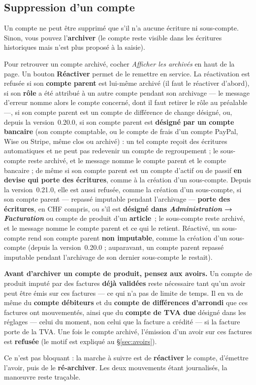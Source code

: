 \documentclass[a4paper,11pt,oneside]{article}
\begin{document}
\subsection{Suppression d'un compte}\label{sec:suppression-compte}

Un compte ne peut être supprimé que s'il n'a aucune écriture ni sous-compte. Sinon, vous pouvez l'\textbf{archiver} (le compte reste visible dans les écritures historiques mais n'est plus proposé à la saisie).

Pour retrouver un compte archivé, cocher \emph{Afficher les archivés} en haut de la page. Un bouton \textbf{Réactiver} permet de le remettre en service. La réactivation est refusée si son \textbf{compte parent} est lui-même archivé (il faut le réactiver d'abord), si son \textbf{rôle} a été attribué à un autre compte pendant son archivage — le message d'erreur nomme alors le compte concerné, dont il faut retirer le rôle au préalable —, si son compte parent est un compte de différence de change désigné, ou, depuis la version~0.20.0, si son compte parent est \textbf{désigné par un compte bancaire} (son compte comptable, ou le compte de frais d'un compte PayPal, Wise ou Stripe, même clos ou archivé) : un tel compte reçoit des écritures automatiques et ne peut pas redevenir un compte de regroupement ; le sous-compte reste archivé, et le message nomme le compte parent et le compte bancaire ; de même si son compte parent est un compte d'actif ou de passif \textbf{en devise qui porte des écritures}, comme à la création d'un sous-compte. Depuis la version~0.21.0, elle est aussi refusée, comme la création d'un sous-compte, si son compte parent --- repassé imputable pendant l'archivage --- \textbf{porte des écritures}, en CHF compris, ou s'il est \textbf{désigné dans \emph{Administration} → \emph{Facturation}} ou compte de produit d'un \textbf{article}~; le sous-compte reste archivé, et le message nomme le compte parent et ce qui le retient. Réactivé, un sous-compte rend son compte parent \textbf{non imputable}, comme la création d'un sous-compte (depuis la version~0.20.0 ; auparavant, un compte parent repassé imputable pendant l'archivage de son dernier sous-compte le restait).

\label{sec:plan-comptable-archivage}

\begin{keshwarning}
\textbf{Avant d'archiver un compte de produit, pensez aux avoirs.} Un compte de produit imputé par des factures \textbf{déjà validées} reste nécessaire tant qu'un avoir peut être émis sur ces factures — ce qui n'a pas de limite de temps. Il en va de même du \textbf{compte débiteurs} et du \textbf{compte de différences d'arrondi} que ces factures ont mouvementés, ainsi que du \textbf{compte de TVA due} désigné dans les réglages --- celui du moment, non celui que la facture a crédité --- si la facture porte de la TVA. Une fois le compte archivé, l'émission d'un avoir sur ces factures est \textbf{refusée} (le motif est expliqué au \S\ref{sec:avoirs}).

Ce n'est pas bloquant : la marche à suivre est de \textbf{réactiver} le compte, d'émettre l'avoir, puis de le \textbf{ré-archiver}. Les deux mouvements étant journalisés, la manœuvre reste traçable.
\end{keshwarning}
\end{document}
